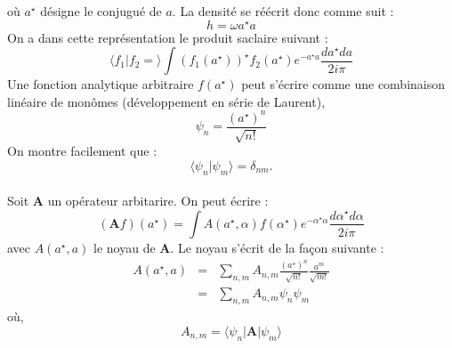 \documentclass[a4paper,11pt]{article}
\theoremstyle{plain}
\theoremstyle{definition}
\theoremstyle{remark}
\numberwithin{equation}{section}
\numberwithin{equation}{subsection}
\numberwithin{figure}{section}
\begin{document}
où $a^{\star}$ désigne le conjugué de $a$.
La densité se réécrit donc comme suit :
\begin{equation}
 h = \omega a^{\star} a
\end{equation}
On a dans cette représentation le produit saclaire suivant :
\begin{equation}
 \langle f_{1} | f_{2} = \rangle \int \left(f_{1} (a^{\star})\right)^{\star} f_{2} (a^{\star}) e^{- a^{\star} a } \frac{da^{\star} da}{2i \pi}
\end{equation}
Une fonction analytique arbitraire $f (a^{\star})$ peut s'écrire comme une combinaison linéaire de monômes (développement en série de Laurent),
\begin{equation}
 \psi_{n} = \frac{(a^{\star})^n}{\sqrt{n !}}
\end{equation}
On montre facilement que : 
\begin{equation}
 \langle \psi_{n} | \psi_{m} \rangle = \delta_{nm}.
\end{equation}\\

\noindent
Soit \textbf{A} un opérateur arbitarire. On peut écrire :\\
\begin{equation}
 (\textbf{A}f)(a^{\star}) = \int A(a^\star,\alpha) f(\alpha^{\star}) e^{-\alpha^{\star} \alpha } \frac{d\alpha^{\star} d\alpha}{2i \pi}
\end{equation}
avec $ A(a^\star,a) $  le noyau de \textbf{A}. Le noyau s'écrit de la façon suivante :
\begin{eqnarray}
 A(a^{\star},a) &=& \sum_{n,m} A_{n,m} \frac{ (a^{\star})^{n} }{ \sqrt{n !} } \frac{a^{m}}{\sqrt{m!}}\\
                &=&  \sum_{n,m} A_{n,m} \psi_{n} \psi_{m}
\end{eqnarray}
où,
\begin{equation}
 A_{n,m} = \langle \psi_{n} | \textbf{A} | \psi_{m} \rangle
\end{equation}
\end{document}
